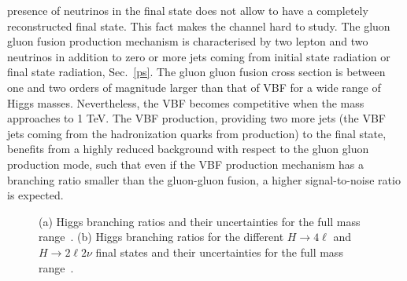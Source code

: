 presence of neutrinos in the final state does not allow to have a completely reconstructed
final state. This fact makes the channel hard to study. 
The gluon gluon fusion production mechanism is characterised by two lepton and two neutrinos in addition to zero or more jets coming from initial state radiation or final state radiation, Sec.~\ref{ps}. The gluon gluon fusion  cross section is between one
and two orders of magnitude larger than that of VBF for a wide range of Higgs masses. Nevertheless, the VBF becomes competitive when the mass approaches to 1 TeV. 
The VBF production, providing two more jets (the VBF jets coming from the hadronization quarks from production) to the final
state, benefits from a highly reduced background with respect to the gluon gluon production mode,
such that even if the VBF production mechanism has a branching ratio smaller than the
gluon-gluon fusion, a higher signal-to-noise ratio is expected.
\begin{figure}
\centering%
\caption{(a) Higgs branching ratios and their uncertainties for the full mass range~\cite{Denner:2011mq}. (b) Higgs branching ratios for the different $H \to 4 \ell$ and $H \to 2\ell 2\nu $ final states and their uncertainties for the full mass range~\cite{Denner:2011mq}.}
\label{br}
\end{figure}



